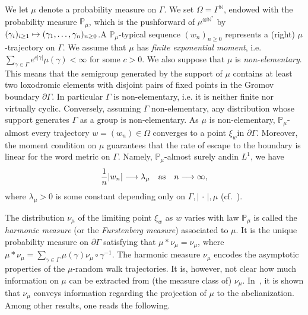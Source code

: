 \documentclass[AHL,Unicode,longabstracts,published]{cedram}
\newcommand{\N}{\mathbb{N}}
\renewcommand{\Pr}{\mathbb{P}}
\renewcommand{\(}{\left(}
\renewcommand{\)}{\right)}
\renewcommand*{\to}{\mathchoice{\longrightarrow}{\rightarrow}{\rightarrow}{\rightarrow}}
\let\oldmapsto\mapsto
\renewcommand*{\mapsto}{\mathchoice{\longmapsto}{\oldmapsto}{\oldmapsto}{\oldmapsto}}
\begin{document}
We let $\mu$ denote a probability measure on $\Gamma$. We set $\Omega =\Gamma^\N$, endowed with the probability measure $\Pr_{\mu}$, which is the pushforward of $\mu^{\otimes \N^{*}}$ by $(\gamma_{i})_{i\geq 1}\mapsto (\gamma_{1},\dots,\gamma_{n})_{n\geq 0}$.\linebreak A $\Pr_{\mu}$-typical sequence $(w_n)_{n \geq 0}$ represents a (right) $\mu$-trajectory on $\Gamma$. We assume that $\mu$ has \emph{finite exponential moment}, i.e. $\sum_{\gamma\in \Gamma}e^{c| \gamma|}\mu(\gamma)<\infty$ for some $c>0$. We also suppose that $\mu$ is \emph{non-elementary}. This means that the semigroup generated by the support of $\mu$ contains at least two loxodromic elements with disjoint pairs of fixed points in the Gromov boundary $\partial \Gamma$. In particular $\Gamma$ is non-elementary, i.e. it is neither finite nor virtually cyclic. Conversely, assuming $\Gamma$ non-elementary, any distribution whose support generates $\Gamma$ as a group is non-elementary. As $\mu$ is non-elementary, $\Pr_{\mu}$-almost every trajectory $w=(w_{n})\in \Omega$ converges to a point $\xi_{w}$\linebreak in $\partial \Gamma$. Moreover, the moment condition on $\mu$ guarantees that the rate of escape to the boundary is linear for the word metric on $\Gamma$. Namely, $\Pr_{\mu}$-almost surely and\linebreak in $L^1$, we have
\begin{equation}\label{Eq:Kingman}
\frac{1}{n}|w_n|\to \lambda_\mu \quad \text{as}\quad n \to \infty,
\end{equation}
where $\lambda_\mu >0$ is some constant depending only on $\Gamma, |\,\cdot\,|, \mu$ (cf.~\cite[Section~7.1]{BMSS}).

The distribution $\nu_\mu$ of the limiting point $\xi_{w}$ as $w$ varies with law $\Pr_{\mu}$ is called the \emph{harmonic measure} (or the \emph{Furstenberg measure}) associated to $\mu$. It is the unique probability measure on $\partial \Gamma$ satisfying that $\mu\ast \nu_\mu=\nu_\mu$, where $\mu\ast \nu_\mu=\sum_{\gamma \in \Gamma}\mu(\gamma)\nu_\mu\circ \gamma^{-1}$. The harmonic measure $\nu_\mu$ encodes the asymptotic properties of the $\mu$-random walk trajectories. It is, however, not clear how much information on $\mu$ can be extracted from (the measure class of) $\nu_\mu$. In~\cite{BenardWinding}, it is shown that $\nu_{\mu}$ conveys information regarding the projection of $\mu$ to the abelianization. Among other results, one reads the following.
\end{document}

